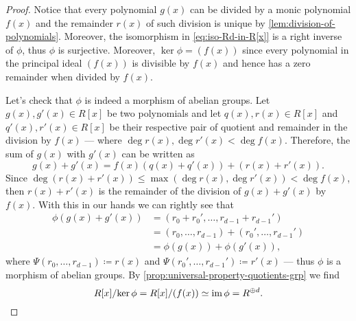 \begin{proof}
    Notice that every polynomial \(g(x)\) can be divided by a monic polynomial
    \(f(x)\) and the remainder \(r(x)\) of such division is unique by
    \cref{lem:division-of-polynomials}. Moreover, the isomorphism in
    \cref{eq:iso-Rd-in-R[x]} is a right inverse of \(\phi\), thus \(\phi\) is
    surjective. Moreover, \(\ker \phi = (f(x))\) since every polynomial in the
    principal ideal \((f(x))\) is divisible by \(f(x)\) and hence has a zero
    remainder when divided by \(f(x)\).

    Let's check that \(\phi\) is indeed a morphism of abelian groups. Let \(g(x),
    g'(x) \in R[x]\) be two polynomials and let \(q(x), r(x) \in R[x]\) and \(q'(x),
    r'(x) \in R[x]\) be their respective pair of quotient and remainder in the
    division by \(f(x)\) --- where \(\deg r(x), \deg r'(x) < \deg f(x)\). Therefore,
    the sum of \(g(x)\) with \(g'(x)\) can be written as
    \[
        g(x) + g'(x) = f(x) (q(x) + q'(x)) + (r(x) + r'(x)).
    \]
    Since \(\deg (r(x) + r'(x)) \leq \max(\deg r(x), \deg r'(x)) < \deg f(x)\), then
    \(r(x) + r'(x)\) is the remainder of the division of \(g(x) + g'(x)\) by
    \(f(x)\). With this in our hands we can rightly see that
    \begin{align*}
        \phi(g(x) + g'(x))
         & = (r_0 + r_0', \dots, r_{d-1} + r_{d-1}')         \\
         & = (r_0, \dots, r_{d-1}) + (r_0', \dots, r_{d-1}') \\
         & =\phi(g(x)) + \phi(g'(x)),
    \end{align*}
    where \(\Psi(r_0, \dots, r_{d-1}) \coloneq r(x)\) and
    \(\Psi(r_0', \dots, r_{d-1}') \coloneq r'(x)\) --- thus \(\phi\) is a morphism
    of abelian groups. By \cref{prop:universal-property-quotients-grp} we find
    \[
        R[x]/{\ker \phi} = R[x]/(f(x)) \simeq \operatorname{im} \phi = R^{\oplus d}.
    \]
\end{proof}


